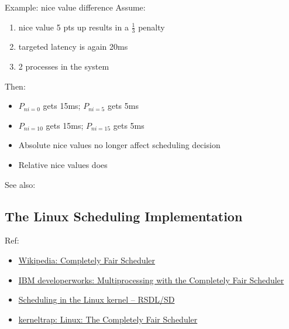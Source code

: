 \begin{frame}
  \begin{block}{Example: nice value difference}
    Assume:
    \begin{enumerate}
    \item nice value 5 pts up results in a $\frac{1}{3}$ penalty
    \item targeted latency is again 20ms
    \item 2 processes in the system
    \end{enumerate}
    Then:
    \begin{itemize}
    \item $P_{ni=0}$ gets 15ms; $P_{ni=5}$ gets 5ms
    \item $P_{ni=10}$ gets 15ms; $P_{ni=15}$ gets 5ms
    \end{itemize}
    \begin{itemize}
    \item Absolute nice values no longer affect scheduling decision
    \item Relative nice values does
    \end{itemize}
  \end{block}
\end{frame}

See also: 

\subsection{The Linux Scheduling Implementation}

Ref: 

\begin{itemize}
\item \href{https://en.wikipedia.org/wiki/Completely\_Fair\_Scheduler}{Wikipedia: Completely
  Fair Scheduler}
\item \href{http://www.ibm.com/developerworks/linux/library/l-cfs/}{IBM developerworks:
    Multiprocessing with the Completely Fair Scheduler}
\item
  \href{http://embeddeddev.wordpress.com/2011/11/23/scheduling-in-the-linux-kernel/}{Scheduling
    in the Linux kernel – RSDL/SD}
\item \href{http://kerneltrap.org/node/8059}{kerneltrap: Linux: The Completely Fair
    Scheduler}
\end{itemize}

